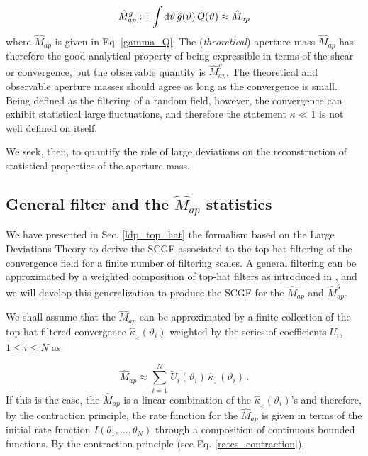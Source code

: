 \documentclass[twocolumn,aps,reprint, nofootinbib]{revtex4}
\newcommand{\dd}{{\rm d}}
\newcommand{\hkappa}{\hat{\kappa}_{_<}}
\newcommand{\tU}{\tilde{U}}
\newcommand{\tQ}{\tilde{Q}}
\newcommand{\Map}{\hat{M}_{ap}}
\newcommand{\Mapg}{\hat{M}_{ap}^g}
\begin{document}
\begin{equation}
\label{Map_g}
\Mapg := \int \dd \vartheta \, \hat{g}(\vartheta) \, \tQ(\vartheta) \approx \Map
\end{equation} 
where $\Map$ is given in Eq. \eqref{gamma_Q}. The (\emph{theoretical}) aperture mass $\Map$ has therefore the good analytical property of being expressible in terms of the shear or convergence, but the observable quantity is $\Mapg$. The theoretical and observable aperture masses should agree as long as the convergence is small. Being defined as the filtering of a random field, however, the convergence can exhibit statistical large fluctuations, and therefore the statement $\kappa \ll 1$ is not well defined on itself.

We seek, then, to quantify the role of large deviations on the reconstruction of statistical properties of the aperture mass.


\subsection{General filter and the $\hat{M}_{ap}$ statistics}

We have presented in Sec. \ref{ldp_top_hat} the formalism based on the Large Deviations Theory to derive the SCGF associated to the top-hat filtering of the convergence field for a finite number of filtering scales. A general filtering can be approximated by a weighted composition of top-hat filters as introduced in \cite{Bernardeau:2015khs}, and we will develop this generalization to produce the SCGF for the $\Map$ and $\Mapg$.

We shall assume that the $\Map$ can be approximated by a finite collection of the top-hat filtered convergence $\hkappa(\vartheta_i)$ weighted by the series of coefficients $\tU_i$, $1 \leq i \leq N$ as:

\begin{equation}
\label{map_sum}
\Map \approx \sum_{i=1}^N \, \tU_i(\vartheta_i)  \, \hkappa(\vartheta_i) \, .
\end{equation}
If this is the case, the $\Map$ is a linear combination of the $\hkappa(\vartheta_i)$'s and therefore, by the contraction principle, the rate function for the $\Map$ is given in terms of the initial rate function $I(\theta_1, \ldots, \theta_N)$ through a composition of continuous bounded functions. By the contraction principle (see Eq. \eqref{rates_contraction}),
\end{document}
